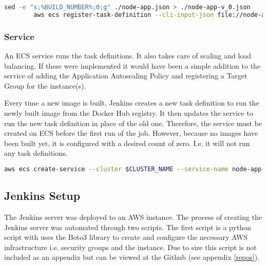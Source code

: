 		\begin{minipage}{\textwidth}
		\begin{lstlisting}[caption={Register Task Definition},language=bash]
		sed -e "s;%BUILD_NUMBER%;0;g" ./node-app.json > ./node-app-v_0.json
		aws ecs register-task-definition --cli-input-json file://node-app-v_0.json	
		\end{lstlisting}
		\end{minipage}
		
		\subsubsection{Service}
		An ECS service runs the task definitions. It also takes care of scaling and load balancing. If these were implemented it would have been a simple addition to the service of adding the Application Autoscaling Policy and registering a Target Group for the instance(s).
		
		Every time a new image is built, Jenkins creates a new task definition to run the newly built image from the Docker Hub registry. It then updates the service to run the new task definition in place of the old one. Therefore, the service must be created on ECS before the first run of the job. However, because no images have been built yet, it is configured with a desired count of zero. I.e. it will not run any task definitions.
		
		\begin{minipage}{\textwidth}
		\begin{lstlisting}[caption={Create Service},language=bash]
		aws ecs create-service --cluster $CLUSTER_NAME --service-name node-app-service --task-definition node-app --desired-count 0
		\end{lstlisting}
		\end{minipage}
		
	\subsection{Jenkins Setup}
	The Jenkins server was deployed to an AWS instance. The process of creating the Jenkins server was automated through two scripts. The first script is a python script with uses the Boto3 library to create and configure the necessary AWS infrastructure i.e. security groups and the instance. Due to size this script is not included as an appendix but can be viewed at the Github (see appendix \autoref{repos}).
	
